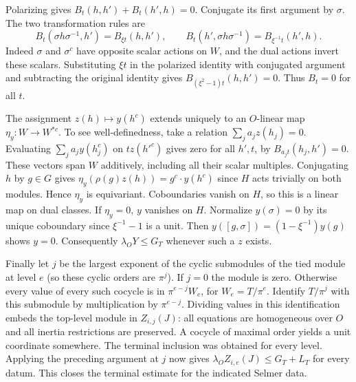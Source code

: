 Polarizing gives $B_t(h,h')+B_t(h',h)=0$. Conjugate its first argument
by $\sigma$. The two transformation rules are
\[
 B_t(\sigma h\sigma^{-1},h')=B_{\xi t}(h,h'),\qquad
 B_t(h',\sigma h\sigma^{-1})=B_{\xi^{-1} t}(h',h).
\]
Indeed $\sigma$ and $\sigma^c$ have opposite scalar actions on $W$,
and the dual actions invert these scalars. Substituting $\xi t$ in
the polarized identity with conjugated argument and subtracting the
original identity gives $B_{(\xi^2-1)t}(h,h')=0$. Thus $B_t=0$ for all $t$.

The assignment $z(h)\mapsto y(h^c)$ extends uniquely to an
$O$-linear map $\eta_y:W\to W^{*c}$. To see well-definedness, take a
relation $\sum_j a_j z(h_j)=0$. Evaluating
$\sum_j a_j y(h_j^c)$ on $t z(h'^c)$ gives zero for all $h',t$, by
$B_{a_jt}(h_j,h')=0$. These vectors span $W$ additively, including
all their scalar multiples. Conjugating $h$ by $g\in G$ gives
$\eta_y(\rho(g)z(h))=g^c\cdot y(h^c)$ since $H$ acts trivially
on both modules. Hence $\eta_y$ is equivariant. Coboundaries vanish
on $H$, so this is a linear map on dual classes. If $\eta_y=0$,
$y$ vanishes on $H$. Normalize $y(\sigma)=0$ by its unique
coboundary since $\xi^{-1}-1$ is a unit. Then
$y([g,\sigma])=(1-\xi^{-1})y(g)$ shows $y=0$.
Consequently $\lambda_O Y\leq G_T$ whenever such a $z$ exists.

Finally let $j$ be the largest exponent of the cyclic submodules of
the tied module at level $e$ (so these cyclic orders are $\pi^j$).
If $j=0$ the module is zero. Otherwise every value of every such cocycle
is in $\pi^{e-j}W_e$, for $W_e=T/\pi^e$. Identify $T/\pi^j$ with
this submodule by multiplication by $\pi^{e-j}$. Dividing values in
this identification embeds the top-level module in $Z_{i,j}(J)$:
all equations are homogeneous over $O$ and all inertia restrictions
are preserved. A cocycle of maximal order yields a unit coordinate
somewhere. The terminal inclusion was obtained for every level.
Applying the preceding argument at $j$ now gives
$\lambda_O Z_{i,e}(J)\leq G_T+L_T$ for every datum.
This closes the terminal estimate for the indicated Selmer data.
